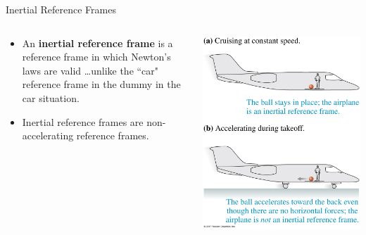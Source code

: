 \documentclass{beamer}
\begin{document}
\begin{frame}{Inertial Reference Frames}
\begin{columns}
\begin{column}{0.5\textwidth}
\begin{itemize}
   \item An {\bf inertial reference frame} is a reference frame in which Newton's laws are valid \ldots unlike the ``car" reference frame in the dummy in the car situation.
   \item Inertial reference frames are non-accelerating reference frames.
\end{itemize}
\end{column}
\begin{column}{0.5\textwidth}
\begin{center}
   \includegraphics[width=\textwidth]{../figures/05_19_Figure.jpg}
\end{center}
\end{column}
\end{columns}
\end{frame}
\end{document}
